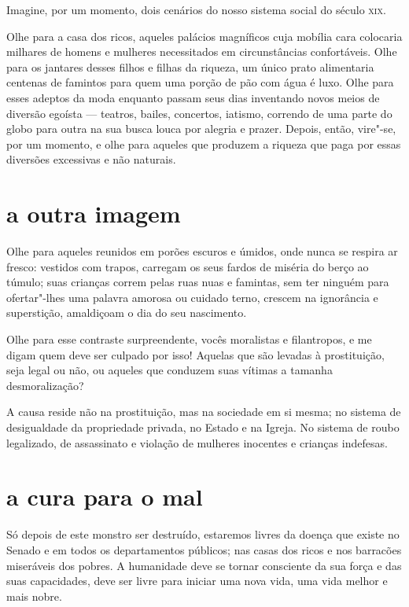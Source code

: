 Imagine, por um momento, dois cenários do nosso sistema social do século \textsc{xix}.

Olhe para a casa dos ricos, aqueles palácios magníficos cuja mobília
cara colocaria milhares de homens e mulheres necessitados em
circunstâncias confortáveis. Olhe para os jantares desses filhos e
filhas da riqueza, um único prato alimentaria centenas de famintos para
quem uma porção de pão com água é luxo. Olhe para esses adeptos da moda
enquanto passam seus dias inventando novos meios de diversão egoísta --- teatros, bailes, concertos, iatismo, correndo de uma parte do globo para
outra na sua busca louca por alegria e prazer. Depois, então, vire"-se,
por um momento, e olhe para aqueles que produzem a riqueza que paga por
essas diversões excessivas e não naturais.

\section{a outra imagem}

Olhe para aqueles reunidos em porões escuros e úmidos, onde nunca se respira
ar fresco: vestidos com trapos, carregam os seus fardos de miséria do
berço ao túmulo; suas crianças correm pelas ruas nuas e famintas, sem ter ninguém para ofertar"-lhes uma palavra amorosa ou cuidado terno, crescem na ignorância e superstição, amaldiçoam o dia do seu nascimento.

Olhe para esse contraste surpreendente, vocês moralistas e filantropos,
e me digam quem deve ser culpado por isso! Aquelas que são levadas à
prostituição, seja legal ou não, ou aqueles que conduzem suas vítimas a
tamanha desmoralização?

A causa reside não na prostituição, mas na sociedade em si mesma; no
sistema de desigualdade da propriedade privada, no Estado e na Igreja. No
sistema de roubo legalizado, de assassinato e violação de mulheres
inocentes e crianças indefesas.

\section{a cura para o mal}

Só depois de este monstro ser destruído, estaremos livres da doença que
existe no Senado e em todos os departamentos públicos; nas casas dos
ricos e nos barracões miseráveis dos pobres. A humanidade deve
se tornar consciente da sua força e das suas capacidades, deve ser livre
para iniciar uma nova vida, uma vida melhor e mais nobre.

